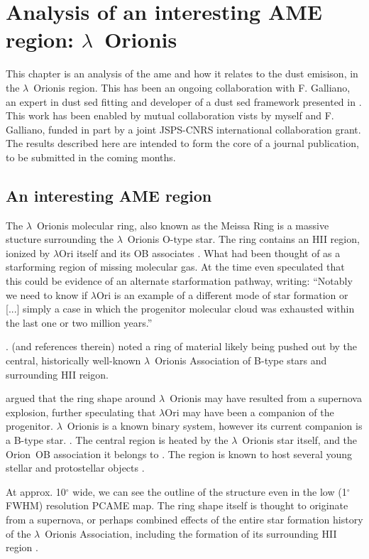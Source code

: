 \chapter{Analysis of an interesting AME region: $\lambda$~Orionis}
\label{ch:lori}
  This chapter is an analysis of the \gls{ame} and how it relates to the dust emisison, in the $\lambda$~Orionis region. This has been an ongoing collaboration with F. Galliano, an expert in dust \gls{sed} fitting and developer of a dust \gls{sed} framework presented in \cite{galliano18}. This work has been enabled by mutual collaboration vists by myself and F. Galliano, funded in part by a joint JSPS-CNRS international collaboration grant. The results described here are intended to form the core of a journal publication, to be submitted in the coming months.

 \section{An interesting AME region}
		The $\lambda$~Orionis molecular ring, also known as the Meissa Ring is a massive stucture surrounding the $\lambda$~Orionis O-type star. The ring contains an HII region, ionized by $\lambda$Ori itself and its OB associates \citep{murdin77}. What had been thought of as a star\-forming region of missing molecular gas. At the time \cite{murdin77} even speculated that this could be evidence of an alternate star\-formation pathway, writing: ``Notably we need to know if $\lambda$Ori is an example of a different mode of star formation or [...] simply a case in which the progenitor molecular cloud was exhausted within the last one or two million years.''

    \cite{maddalena86,maddalena87}.  (and references therein) noted a ring of material likely being pushed out by the central, historically well-known $\lambda$~Orionis Association of B-type stars and surrounding HII reigon.


    \cite{cunha96} argued that the ring shape around $\lambda$~Orionis may have resulted from a supernova explosion, further speculating that $\lambda$Ori may have been a companion of the progenitor. $\lambda$~Orionis is a known binary system, however its current companion is a B-type star. \citep{murdin77}
  .
     The central region is heated by the $\lambda$~Orionis star itself, and the Orion~OB association it belongs to \citep{ochsendorf15}. The region is known to host several young stellar and protostellar objects \citep{koenig15}.

    At approx. 10$^{\circ}$ wide, we can see the outline of the structure even in the low (1$^{\circ}$ FWHM) resolution PCAME map. The ring shape itself is thought to originate from a supernova, or perhaps combined effects of the entire star formation history of the $\lambda$~Orionis Association, including the formation of its surrounding HII region \citep{aran09}.

